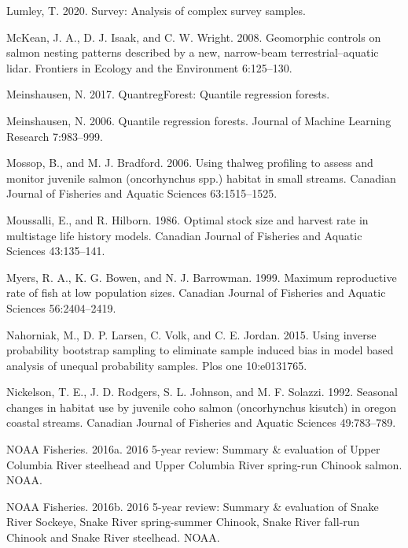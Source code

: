 \documentclass[
  12pt,
]{article}
\begin{document}
\leavevmode\hypertarget{ref-R-survey}{}%
Lumley, T. 2020. Survey: Analysis of complex survey samples.

\leavevmode\hypertarget{ref-McKean2008}{}%
McKean, J. A., D. J. Isaak, and C. W. Wright. 2008. Geomorphic controls on salmon nesting patterns described by a new, narrow-beam terrestrial--aquatic lidar. Frontiers in Ecology and the Environment 6:125--130.

\leavevmode\hypertarget{ref-R-quantregForest}{}%
Meinshausen, N. 2017. QuantregForest: Quantile regression forests.

\leavevmode\hypertarget{ref-Meinshausen2006}{}%
Meinshausen, N. 2006. Quantile regression forests. Journal of Machine Learning Research 7:983--999.

\leavevmode\hypertarget{ref-Mossop2006}{}%
Mossop, B., and M. J. Bradford. 2006. Using thalweg profiling to assess and monitor juvenile salmon (oncorhynchus spp.) habitat in small streams. Canadian Journal of Fisheries and Aquatic Sciences 63:1515--1525.

\leavevmode\hypertarget{ref-Moussalli1986}{}%
Moussalli, E., and R. Hilborn. 1986. Optimal stock size and harvest rate in multistage life history models. Canadian Journal of Fisheries and Aquatic Sciences 43:135--141.

\leavevmode\hypertarget{ref-Myers1999}{}%
Myers, R. A., K. G. Bowen, and N. J. Barrowman. 1999. Maximum reproductive rate of fish at low population sizes. Canadian Journal of Fisheries and Aquatic Sciences 56:2404--2419.

\leavevmode\hypertarget{ref-Nahorniak2015}{}%
Nahorniak, M., D. P. Larsen, C. Volk, and C. E. Jordan. 2015. Using inverse probability bootstrap sampling to eliminate sample induced bias in model based analysis of unequal probability samples. Plos one 10:e0131765.

\leavevmode\hypertarget{ref-Nickelson1992}{}%
Nickelson, T. E., J. D. Rodgers, S. L. Johnson, and M. F. Solazzi. 1992. Seasonal changes in habitat use by juvenile coho salmon (oncorhynchus kisutch) in oregon coastal streams. Canadian Journal of Fisheries and Aquatic Sciences 49:783--789.

\leavevmode\hypertarget{ref-NOAA2016}{}%
NOAA Fisheries. 2016a. 2016 5-year review: Summary \& evaluation of Upper Columbia River steelhead and Upper Columbia River spring-run Chinook salmon. NOAA.

\leavevmode\hypertarget{ref-NOAA2016b}{}%
NOAA Fisheries. 2016b. 2016 5-year review: Summary \& evaluation of Snake River Sockeye, Snake River spring-summer Chinook, Snake River fall-run Chinook and Snake River steelhead. NOAA.
\end{document}

